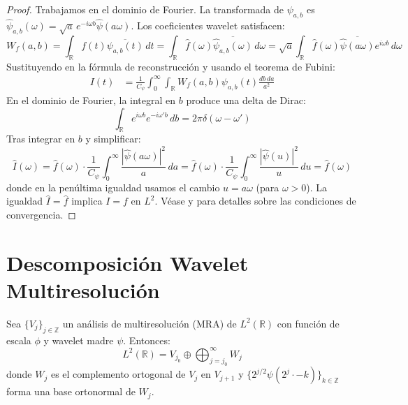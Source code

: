 \begin{proof}
Trabajamos en el dominio de Fourier. La transformada de $\psi_{a,b}$ es $\hat{\psi}_{a,b}(\omega) = \sqrt{a} \, e^{-i\omega b} \hat{\psi}(a\omega)$. Los coeficientes wavelet satisfacen:
\[
W_f(a,b) = \int_{\mathbb{R}} f(t) \overline{\psi_{a,b}(t)} \, dt = \int_{\mathbb{R}} \hat{f}(\omega) \overline{\hat{\psi}_{a,b}(\omega)} \, d\omega = \sqrt{a} \int_{\mathbb{R}} \hat{f}(\omega) \overline{\hat{\psi}(a\omega)} e^{i\omega b} \, d\omega
\]
Sustituyendo en la fórmula de reconstrucción y usando el teorema de Fubini:
\begin{align}
I(t) &= \frac{1}{C_\psi} \int_0^\infty \int_{\mathbb{R}} W_f(a,b) \psi_{a,b}(t) \frac{db \, da}{a^2}
\end{align}
En el dominio de Fourier, la integral en $b$ produce una delta de Dirac:
\[
\int_{\mathbb{R}} e^{i\omega b} e^{-i\omega' b} \, db = 2\pi \delta(\omega - \omega')
\]
Tras integrar en $b$ y simplificar:
\[
\hat{I}(\omega) = \hat{f}(\omega) \cdot \frac{1}{C_\psi} \int_0^\infty \frac{|\hat{\psi}(a\omega)|^2}{a} \, da = \hat{f}(\omega) \cdot \frac{1}{C_\psi} \int_0^\infty \frac{|\hat{\psi}(u)|^2}{u} \, du = \hat{f}(\omega)
\]
donde en la penúltima igualdad usamos el cambio $u = a\omega$ (para $\omega > 0$). La igualdad $\hat{I} = \hat{f}$ implica $I = f$ en $L^2$. Véase \citep[Teorema~4.3]{Mallat2009} y \citep[Capítulo~2]{Daubechies1992} para detalles sobre las condiciones de convergencia.
\end{proof}

\section{Descomposición Wavelet Multiresolución}\label{sec:descomposicion_wavelet}

\begin{theorem}\label{thm:descomposicion_wavelet_apendice}
Sea $\{V_j\}_{j \in \mathbb{Z}}$ un análisis de multiresolución (MRA) de $L^2(\mathbb{R})$ con función de escala $\phi$ y wavelet madre $\psi$. Entonces:
\[
L^2(\mathbb{R}) = V_{j_0} \oplus \bigoplus_{j=j_0}^{\infty} W_j
\]
donde $W_j$ es el complemento ortogonal de $V_j$ en $V_{j+1}$ y $\{2^{j/2}\psi(2^j \cdot - k)\}_{k \in \mathbb{Z}}$ forma una base ortonormal de $W_j$.
\end{theorem}

